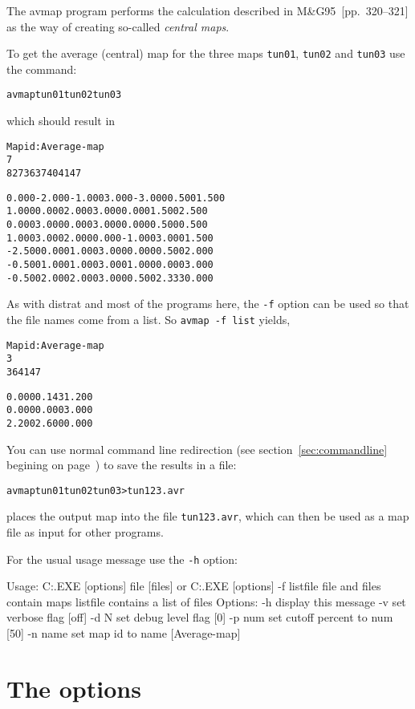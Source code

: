 \documentclass[%
	11pt,
        a4paper,
        twoside]{workrep}
\newcommand*{\prg}[1]{\textsf{#1}}		%
\newcommand*{\cmd}[1]{\texttt{#1}}		%
\newcommand*{\file}[1]{\texttt{#1}}		%
\newcommand*{\nt}[1]{\textit{#1}}		%
\newcommand*{\opt}[1]{\texttt{#1}}		%
\newcommand{\MG}{M\&G95\xspace}			%
\begin{document}
The \prg{avmap} program performs the calculation described in
\MG~[pp.~320--321] as the way of creating so-called \nt{central maps}.

To get the average (central) map for the three maps \file{tun01},
\file{tun02} and \file{tun03} use the command:
\begin{alltt}
  avmap tun01 tun02 tun03
\end{alltt}
which should result in
\begin{alltt}
Map id: Average-map
7
     8     27     36     37     40     41     47

 0.000 -2.000 -1.000  3.000 -3.000  0.500  1.500
 1.000  0.000  2.000  3.000  0.000  1.500  2.500
 0.000  3.000  0.000  3.000  0.000  0.500  0.500
 1.000  3.000  2.000  0.000 -1.000  3.000  1.500
-2.500  0.000  1.000  3.000  0.000  0.500  2.000
-0.500  1.000  1.000  3.000  1.000  0.000  3.000
-0.500  2.000  2.000  3.000  0.500  2.333  0.000
\end{alltt}

As with \prg{distrat} and most of the programs here, the \opt{-f} option
can be used so that the file names come from a list.
So \cmd{avmap -f list} yields,
\begin{alltt}
Map id: Average-map
3
    36     41     47

 0.000  0.143  1.200
 0.000  0.000  3.000
 2.200  2.600  0.000
\end{alltt}

You can use normal command line redirection
(see section~\ref{sec:commandline} begining on page~\pageref{sec:commandline})
to save the results in a file:
\begin{alltt}
 avmap tun01 tun02 tun03 > tun123.avr
\end{alltt}
places the output map into the file \file{tun123.avr}, which can
then be used as a map file as input for other programs.

For the usual usage message use the \opt{-h} option:
\begin{verbatimtab}
Usage: C:\BIN\AVMAP.EXE [options] file [files]
   or  C:\BIN\AVMAP.EXE [options] -f listfile
	file and files contain maps
	listfile contains a list of files
	Options:
		-h	display this message
		-v	set verbose flag [off]
		-d N	set debug level flag [0]
		-p num	set cutoff percent to num [50]
		-n name	set map id to name [Average-map]
\end{verbatimtab}

\section{The options}
\end{document}
